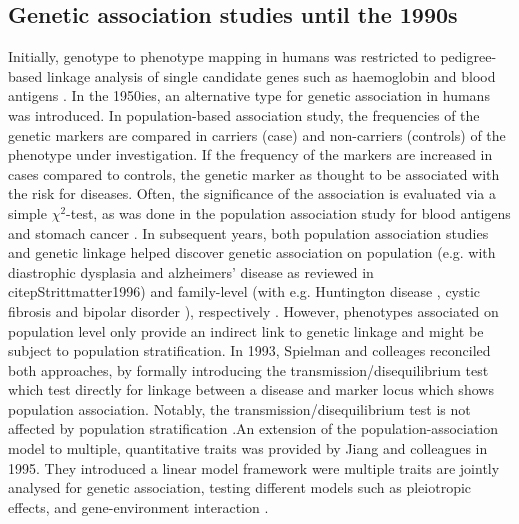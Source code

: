 \subsection{Genetic association studies until the 1990s}
Initially, genotype to phenotype mapping in humans was restricted to pedigree-based linkage analysis \citep{Bernstein1930,Haldane1934,Penrose1935} of single candidate genes such as haemoglobin \citep{Ingram1959} and blood antigens \citep{Bernstein1930,Haldane1934,Penrose1935}. In the 1950ies,  an alternative type for genetic association in humans was introduced. In population-based association study,  the frequencies of the genetic markers are compared in carriers (case) and non-carriers (controls) of the phenotype under investigation. If the frequency of the markers are increased in cases compared to controls, the genetic marker as thought to be associated with the risk for diseases. Often, the significance of the association is evaluated via a simple \(\chi ^2\)-test, as was done in the population association study for blood antigens and stomach cancer \citep{Aird1953,Aird1954}. In subsequent years, both population association studies and genetic linkage helped discover genetic association on population (e.g. with diastrophic dysplasia \citep{Hästbacka1992} and alzheimers' disease as reviewed in citep{Strittmatter1996}) and family-level (with e.g. Huntington disease \citep{Gusella1983}, cystic fibrosis \citep{Kerem1989} and bipolar disorder \citep{Baron1987}), respectively . However, phenotypes associated on population level only provide an indirect link to genetic linkage \citep{Cox1988,Spielman1993} and might be subject to population stratification. In 1993, Spielman and colleages reconciled both approaches, by formally introducing the transmission/disequilibrium test which test directly for linkage between a disease and marker locus which shows population association. Notably, the transmission/disequilibrium test is not affected by population stratification \citep{Spielman1993}.An extension of the population-association model to multiple, quantitative traits was provided by Jiang and colleagues in 1995. They introduced a linear model framework were multiple traits are jointly analysed for genetic association, testing different models such as pleiotropic effects, and gene-environment interaction \citep{Jiang1995}. 

